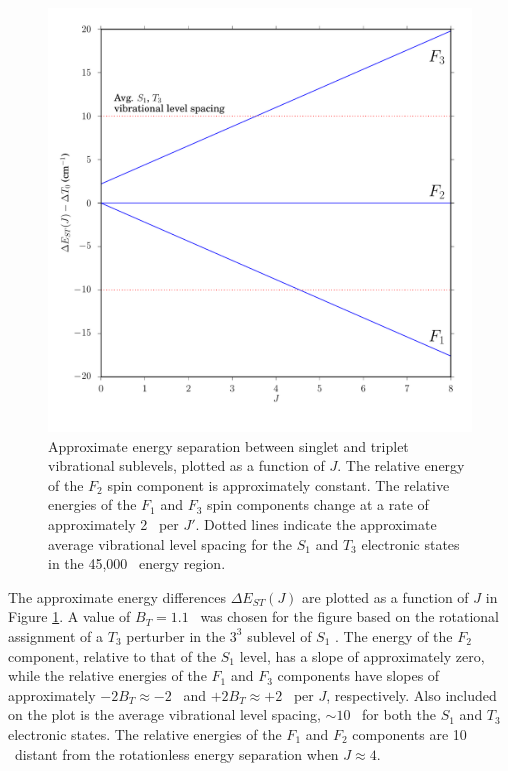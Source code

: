 \begin{figure}
  \caption{Approximate energy separation between singlet and triplet
    vibrational sublevels, plotted as a function of $J$.  The relative
    energy of the $F_2$ spin component is approximately constant.  The
    relative energies of the $F_1$ and $F_3$ spin components change at
    a rate of approximately 2 \rcm\ per $J'$.  Dotted lines indicate
    the approximate average vibrational level spacing for the $S_1$
    and $T_3$ electronic states in the 45,000 \rcm\ energy region.}
  \label{fig:rotational-energy-differences}
  \centering
  \includegraphics[width=6in]{rotational-energy-differences.pdf}
\end{figure}

The approximate energy differences $\Delta E_{ST}(J)$ are plotted as a
function of $J$ in Figure \ref{fig:rotational-energy-differences}.  A
value of $B_T=1.1$ \rcm\ was chosen for the figure based on the
rotational assignment of a $T_3$ perturber in the $3^3$ 
sublevel of $S_1$ \cite{mishra04}.  The energy of the $F_2$ component,
relative to that of the $S_1$ level, has a slope of approximately
zero, while the relative energies of the $F_1$ and $F_3$ components
have slopes of approximately $-2B_T \approx -2$ \rcm\ and $+2B_T
\approx +2$ \rcm\ per $J$, respectively.  Also included on the plot is
the average vibrational level spacing, $\sim 10$ \rcm\, for both the
$S_1$ and $T_3$ electronic states.  The relative energies of the $F_1$
and $F_2$ components are 10 \rcm\ distant from the rotationless energy
separation when $J \approx 4$.

